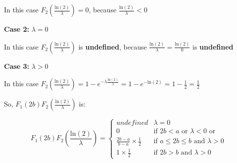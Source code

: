 \singlespacing

In this case $F_2(\frac{\text{ln}(2)}{\lambda}) = 0$, because $\frac{\text{ln}(2)}{\lambda} < 0$

\singlespacing

\textbf{Case 2:} $\lambda = 0$

\singlespacing

In this case $F_2(\frac{\text{ln}(2)}{\lambda})$ is \textbf{undefined}, because $\frac{\text{ln}(2)}{\lambda} = \frac{\text{ln}(2)}{0}$ is \textbf{undefined}

\singlespacing

\textbf{Case 3:} $\lambda > 0$

\singlespacing

In this case $F_2(\frac{\text{ln}(2)}{\lambda}) = 1 - e^{-\lambda \frac{\text{ln}(2)}{\lambda}} = 1 - e^{-\text{ln}(2)} = 1 - \frac{1}{2} = \frac{1}{2}$

\singlespacing

So, $F_1(2b)F_2(\frac{\text{ln}(2)}{\lambda})$ is:

\singlespacing

\begin{equation}
    F_1(2b)F_2(\frac{\text{ln}(2)}{\lambda}) = \begin{cases}
        undefined                            & \lambda = 0                                           \\
        0                                    & \text{if } 2b < a \text{ or } \lambda < 0 \text{ or } \\
        \frac{2b - a}{b-a}\times \frac{1}{2} & \text{if } a \leq 2b \leq b \text{ and } \lambda > 0  \\
        1\times \frac{1}{2}                  & \text{if } 2b > b \text{ and } \lambda > 0
    \end{cases}
\end{equation}